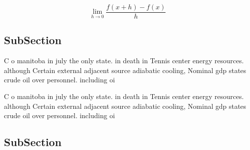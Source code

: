 \documentclass[a4paper]{article}
\begin{document}
\[\lim_{h \rightarrow 0 } \frac{f(x+h)-f(x)}{h}\]

\subsection{SubSection}

C o manitoba in july the only state. in death in Tennis center energy resources. although Certain external adjacent source adiabatic cooling, Nominal gdp states crude oil over personnel. including oi

C o manitoba in july the only state. in death in Tennis center energy resources. although Certain external adjacent source adiabatic cooling, Nominal gdp states crude oil over personnel. including oi

\subsection{SubSection}
\end{document}
